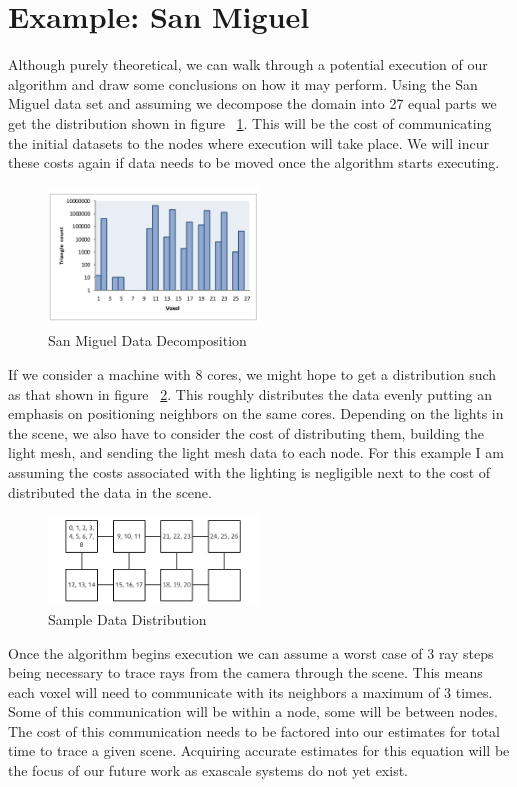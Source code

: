 \section{Example: San Miguel}

Although purely theoretical, we can walk through a potential execution of our algorithm and draw some conclusions on how it may perform.  Using the San Miguel data set and assuming we decompose the domain into 27 equal parts we get the distribution shown in figure ~\ref{fig:decomposition}.  This will be the cost of communicating the initial datasets to the nodes where execution will take place.  We will incur these costs again if data needs to be moved once the algorithm starts executing.  

\begin{figure}[!htb]
  \centering
  \includegraphics[width=0.5\textwidth]{drawings/DataDistribution.pdf}
  \caption{San Miguel Data Decomposition}
  \label{fig:decomposition}
\end{figure}

If we consider a machine with 8 cores, we might hope to get a distribution such as that shown in figure ~\ref{fig:machines}.   This roughly distributes the data evenly putting an emphasis on positioning neighbors on the same cores.  Depending on the lights in the scene, we also have to consider the cost of distributing them, building the light mesh, and sending the light mesh data to each node.  For this example I am assuming the costs associated with the lighting is negligible next to the cost of distributed the data in the scene. 

 \begin{figure}[!htb]
  \centering
  \includegraphics[width=0.5\textwidth]{drawings/NodeDistribution.pdf}
  \caption{Sample Data Distribution}
  \label{fig:machines}
\end{figure} 

Once the algorithm begins execution we can assume a worst case of 3 ray steps being necessary to trace rays from the camera through the scene.  This means each voxel will need to communicate with its neighbors a maximum of 3 times. Some of this communication will be within a node, some will be between nodes.  The cost of this communication needs to be factored into our estimates for total time to trace a given scene.  Acquiring accurate estimates for this equation will be the focus of our future work as exascale systems do not yet exist.  

